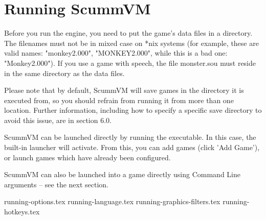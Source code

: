 \section{Running ScummVM}

Before you run the engine, you need to put the game's data files in a
directory. The filenames must not be in mixed case on *nix systems
(for example, these are valid names: "monkey2.000", "MONKEY2.000", while
this is a bad one: "Monkey2.000"). If you use a game with speech, the file
monster.sou must reside in the same directory as the data files.

Please note that by default, ScummVM will save games in the directory
it is executed from, so you should refrain from running it from more than
one location. Further information, including how to specify a specific save
directory to avoid this issue, are in section 6.0.

ScummVM can be launched directly by running the executable. In this case,
the built-in launcher will activate. From this, you can add games (click
'Add Game'), or launch games which have already been configured.

ScummVM can also be launched into a game directly using Command Line
arguments -- see the next section.


 {running-options.tex}
 {running-language.tex}
 {running-graphics-filters.tex}
 {running-hotkeys.tex}


